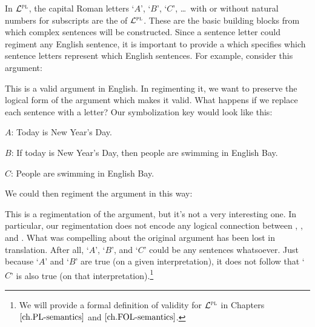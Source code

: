 In $\mathcal{L}^{\textsc{pl}}$, the capital Roman letters `$A$', `$B$', `$C$', \ldots\ with or without natural numbers for subscripts are the  of $\mathcal{L}^{\textsc{pl}}$.
These are the basic building blocks from which complex sentences will be constructed.
Since a sentence letter could regiment any English sentence, it is important to provide a  which specifies which sentence letters represent which English sentences.
For example, consider this argument:

\begin{earg} \label{newyear}
\end{earg}

This is a valid argument in English.
In regimenting it, we want to preserve the logical form of the argument which makes it valid.
What happens if we replace each sentence with a letter? 
Our symbolization key would look like this:

\begin{ekey}
  \item[$A$:] Today is New Year's Day.
  \item[$B$:] If today is New Year's Day, then people are swimming in English Bay.
  \item[$C$:] People are swimming in English Bay.
\end{ekey}

We could then regiment the argument in this way:

\begin{earg}
\end{earg}

This is a regimentation of the argument, but it's not a very interesting one.
In particular, our regimentation does not encode any logical connection between , , and .
What was compelling about the original argument has been lost in translation.
After all, `$A$', `$B$', and `$C$' could be any sentences whatsoever.
Just because `$A$' and `$B$' are true (on a given interpretation), it does not follow that `$C$' is also true (on that interpretation).\footnote{We will provide a formal definition of validity for $\mathcal{L}^{\textsc{pl}}$ in Chapters $\ref{ch.PL-semantics}$ and $\ref{ch.FOL-semantics}$.}


